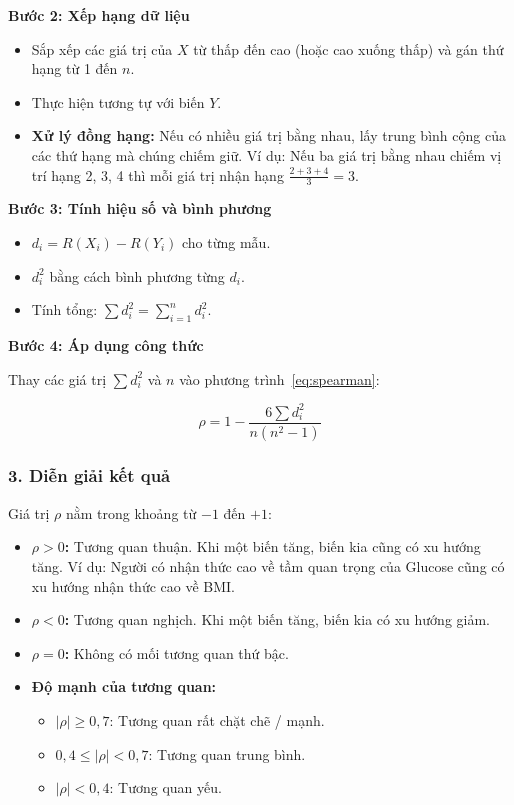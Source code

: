 \documentclass[14pt,a4paper]{extreport}
\begin{document}
\textbf{Bước 2: Xếp hạng dữ liệu}

\begin{itemize}
  \item Sắp xếp các giá trị của $X$ từ thấp đến cao (hoặc cao xuống thấp) và gán thứ hạng từ 1 đến $n$.
  \item Thực hiện tương tự với biến $Y$.
  \item \textbf{Xử lý đồng hạng:} Nếu có nhiều giá trị bằng nhau, lấy trung bình cộng của các thứ hạng mà chúng chiếm giữ. Ví dụ: Nếu ba giá trị bằng nhau chiếm vị trí hạng 2, 3, 4 thì mỗi giá trị nhận hạng $\frac{2+3+4}{3} = 3$.
\end{itemize}

\textbf{Bước 3: Tính hiệu số và bình phương}

\begin{itemize}
  \item $d_i = R(X_i) - R(Y_i)$ cho từng mẫu.
  \item $d_i^2$ bằng cách bình phương từng $d_i$.
  \item Tính tổng: $\sum d_i^2 = \sum_{i=1}^{n} d_i^2$.
\end{itemize}

\textbf{Bước 4: Áp dụng công thức}

Thay các giá trị $\sum d_i^2$ và $n$ vào phương trình~\eqref{eq:spearman}:

\[
\rho = 1 - \frac{6 \sum d_i^2}{n(n^2 - 1)}
\]

\subsubsection*{3. Diễn giải kết quả}

Giá trị $\rho$ nằm trong khoảng từ $-1$ đến $+1$:

\begin{itemize}
  \item \textbf{$\rho > 0$:} Tương quan thuận. Khi một biến tăng, biến kia cũng có xu hướng tăng. Ví dụ: Người có nhận thức cao về tầm quan trọng của Glucose cũng có xu hướng nhận thức cao về BMI.
  \item \textbf{$\rho < 0$:} Tương quan nghịch. Khi một biến tăng, biến kia có xu hướng giảm.
  \item \textbf{$\rho = 0$:} Không có mối tương quan thứ bậc.
  \item \textbf{Độ mạnh của tương quan:}
    \begin{itemize}
      \item $|\rho| \geq 0{,}7$: Tương quan rất chặt chẽ / mạnh.
      \item $0{,}4 \leq |\rho| < 0{,}7$: Tương quan trung bình.
      \item $|\rho| < 0{,}4$: Tương quan yếu.
    \end{itemize}
\end{itemize}
\end{document}
